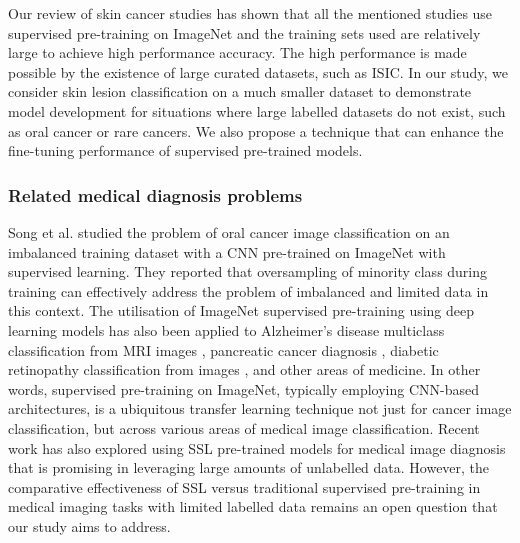 \documentclass[a4paper,fleqn]{cas-dc}
\begin{document}

Our review of skin cancer studies has shown that all the mentioned studies  use supervised pre-training on ImageNet and the training sets used are relatively large to achieve high performance accuracy. The high performance is made possible by the existence of large curated datasets, such as ISIC. In our study, we consider skin lesion classification on a much smaller dataset to demonstrate model development for situations where large labelled datasets do not exist, such as oral cancer or rare cancers. We also propose a technique that can enhance the fine-tuning performance of supervised pre-trained models. %

\subsubsection{Related  medical diagnosis problems}


Song et al. \cite{song2021classification} studied the problem of oral cancer image classification on an imbalanced training dataset with a CNN pre-trained on ImageNet with supervised learning. They reported that oversampling of minority class during training can effectively address the problem of imbalanced and limited data in this context. The utilisation of ImageNet supervised pre-training using deep learning models has also been applied to 
Alzheimer's disease multiclass classification from MRI images \cite{khan2023transfer}, pancreatic cancer diagnosis \cite{baldota2021deep}, diabetic retinopathy classification from images \cite{jabbar2022transfer}, and other areas of medicine. In other words, supervised pre-training on ImageNet, typically employing CNN-based architectures, is a ubiquitous transfer learning technique not just for cancer image classification, but across various areas of medical image classification. Recent work has also explored using SSL pre-trained models for medical image diagnosis \cite{Huang2023} that is promising in leveraging large amounts of unlabelled data. However, the comparative effectiveness of SSL versus traditional supervised pre-training in medical imaging tasks with limited labelled data remains an open question that our study aims to address.


\end{document}
